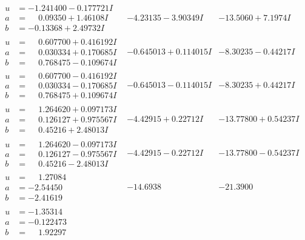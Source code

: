 \documentclass[1p]{elsarticle_modified}
\theoremstyle{definition}
\begin{document}
$$\begin{array}{c|c|c}
\begin{aligned}
u &= -1.241400 - 0.177721 I \\
a &= \phantom{-}0.09350 + 1.46108 I \\
b &= -0.13368 + 2.49732 I\end{aligned}
 & -4.23135 - 3.90349 I & -13.5060 + 7.1974 I \\ \hline\begin{aligned}
u &= \phantom{-}0.607700 + 0.416192 I \\
a &= \phantom{-}0.030334 + 0.170685 I \\
b &= \phantom{-}0.768475 - 0.109674 I\end{aligned}
 & -0.645013 + 0.114015 I & -8.30235 - 0.44217 I \\ \hline\begin{aligned}
u &= \phantom{-}0.607700 - 0.416192 I \\
a &= \phantom{-}0.030334 - 0.170685 I \\
b &= \phantom{-}0.768475 + 0.109674 I\end{aligned}
 & -0.645013 - 0.114015 I & -8.30235 + 0.44217 I \\ \hline\begin{aligned}
u &= \phantom{-}1.264620 + 0.097173 I \\
a &= \phantom{-}0.126127 + 0.975567 I \\
b &= \phantom{-}0.45216 + 2.48013 I\end{aligned}
 & -4.42915 + 0.22712 I & -13.77800 + 0.54237 I \\ \hline\begin{aligned}
u &= \phantom{-}1.264620 - 0.097173 I \\
a &= \phantom{-}0.126127 - 0.975567 I \\
b &= \phantom{-}0.45216 - 2.48013 I\end{aligned}
 & -4.42915 - 0.22712 I & -13.77800 - 0.54237 I \\ \hline\begin{aligned}
u &= \phantom{-}1.27084\phantom{ +0.000000I} \\
a &= -2.54450\phantom{ +0.000000I} \\
b &= -2.41619\phantom{ +0.000000I}\end{aligned}
 & -14.6938\phantom{ +0.000000I} & -21.3900\phantom{ +0.000000I} \\ \hline\begin{aligned}
u &= -1.35314\phantom{ +0.000000I} \\
a &= -0.122473\phantom{ +0.000000I} \\
b &= \phantom{-}1.92297\phantom{ +0.000000I}\end{aligned}

\end{array}$$
\end{document}
